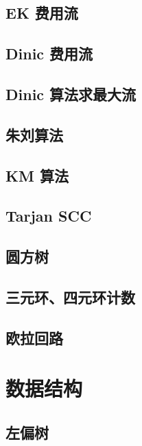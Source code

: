 \documentclass[a4paper,12pt]{article}
\begin{document}
\subsection{EK 费用流}

\subsection{Dinic 费用流}

\subsection{Dinic 算法求最大流}

\subsection{朱刘算法}

\subsection{KM 算法}

\subsection{Tarjan SCC}

\subsection{圆方树}

\subsection{三元环、四元环计数}

\subsection{欧拉回路}


\section{数据结构}

\subsection{左偏树}

\end{document}
